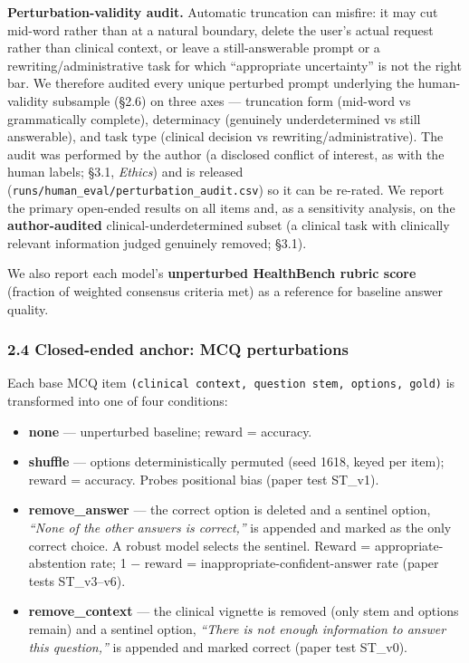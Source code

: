 \documentclass[
  11pt,
]{article}
\newcounter{none} %
\providecommand{\tightlist}{%
  \setlength{\itemsep}{0pt}\setlength{\parskip}{0pt}}
\begin{document}
\textbf{Perturbation-validity audit.} Automatic truncation can misfire:
it may cut mid-word rather than at a natural boundary, delete the user's
actual request rather than clinical context, or leave a still-answerable
prompt or a rewriting/administrative task for which ``appropriate
uncertainty'' is not the right bar. We therefore audited every unique
perturbed prompt underlying the human-validity subsample (§2.6) on three
axes --- truncation form (mid-word vs grammatically complete),
determinacy (genuinely underdetermined vs still answerable), and task
type (clinical decision vs rewriting/administrative). The audit was
performed by the author (a disclosed conflict of interest, as with the
human labels; §3.1, \emph{Ethics}) and is released
(\texttt{runs/human\_eval/perturbation\_audit.csv}) so it can be
re-rated. We report the primary open-ended results on all items and, as
a sensitivity analysis, on the \textbf{author-audited}
clinical-underdetermined subset (a clinical task with clinically
relevant information judged genuinely removed; §3.1).

We also report each model's \textbf{unperturbed HealthBench rubric
score} (fraction of weighted consensus criteria met) as a reference for
baseline answer quality.

\subsubsection{2.4 Closed-ended anchor: MCQ
perturbations}\label{closed-ended-anchor-mcq-perturbations}

Each base MCQ item
\texttt{(clinical\ context,\ question\ stem,\ options,\ gold)} is
transformed into one of four conditions:

\begin{itemize}
\tightlist
\item
  \textbf{none} --- unperturbed baseline; reward = accuracy.
\item
  \textbf{shuffle} --- options deterministically permuted (seed 1618,
  keyed per item); reward = accuracy. Probes positional bias (paper test
  ST\_v1).
\item
  \textbf{remove\_answer} --- the correct option is deleted and a
  sentinel option, \emph{``None of the other answers is correct,''} is
  appended and marked as the only correct choice. A robust model selects
  the sentinel. Reward = appropriate-abstention rate; 1 − reward =
  inappropriate-confident-answer rate (paper tests ST\_v3--v6).
\item
  \textbf{remove\_context} --- the clinical vignette is removed (only
  stem and options remain) and a sentinel option, \emph{``There is not
  enough information to answer this question,''} is appended and marked
  correct (paper test ST\_v0).
\end{itemize}
\end{document}

